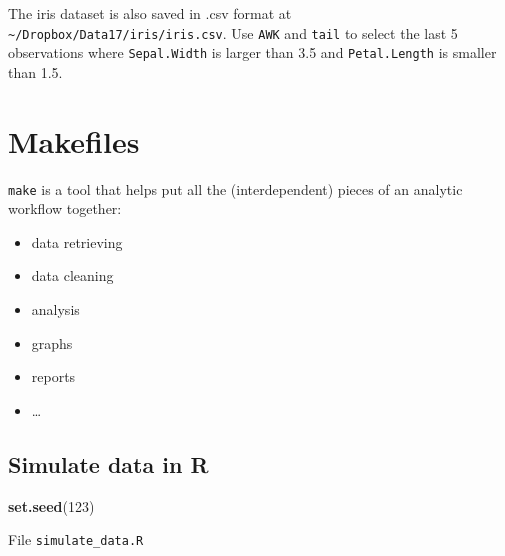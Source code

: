 \documentclass[]{book}
\newenvironment{Shaded}{\begin{snugshade}}{\end{snugshade}}
\newcommand{\KeywordTok}[1]{\textcolor[rgb]{0.13,0.29,0.53}{\textbf{#1}}}
\newcommand{\DecValTok}[1]{\textcolor[rgb]{0.00,0.00,0.81}{#1}}
\newcommand{\NormalTok}[1]{#1}
\providecommand{\tightlist}{%
  \setlength{\itemsep}{0pt}\setlength{\parskip}{0pt}}
\theoremstyle{definition}
\theoremstyle{definition}
\theoremstyle{definition}
\theoremstyle{remark}
\let\BeginKnitrBlock\begin \let\EndKnitrBlock\end
\begin{document}
\BeginKnitrBlock{exercise}
\protect\hypertarget{exr:unnamed-chunk-11}{}{\label{exr:unnamed-chunk-11}
}The iris dataset is also saved in .csv format at
\texttt{\textasciitilde{}/Dropbox/Data17/iris/iris.csv}. Use
\texttt{AWK} and \texttt{tail} to select the last 5 observations where
\texttt{Sepal.Width} is larger than 3.5 and \texttt{Petal.Length} is
smaller than 1.5.
\EndKnitrBlock{exercise}

\section{Makefiles}\label{makefiles}

\texttt{make} is a tool that helps put all the (interdependent) pieces
of an analytic workflow together:

\begin{itemize}
\tightlist
\item
  data retrieving
\item
  data cleaning
\item
  analysis
\item
  graphs
\item
  reports
\item
  \ldots{}
\end{itemize}

\subsection{Simulate data in R}\label{simulate-data-in-r}

\begin{Shaded}
\begin{Highlighting}[]
\KeywordTok{set.seed}\NormalTok{(}\DecValTok{123}\NormalTok{)}
\end{Highlighting}
\end{Shaded}

File \texttt{simulate\_data.R}
\end{document}

